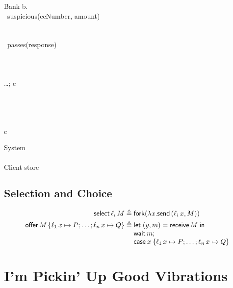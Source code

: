 \documentclass[orivec,envcountsame]{llncs}
\begin{document}
\begin{code}
Bank  \lambda b. \bl
   \\
  \ suspicious(ccNumber, amount)\  \\
  \quad\bl
     \\
     \\
    \ passes(response)\  \\
    \quad \bl
       \\
       \\
       \\
      \dots; c \el \\
     \\
    \quad \bl
       \\
       \\
       \\
      c \el
  \el
\el
\end{code}

\begin{code}
System  \bl
   \\
   \\
  Client \app store
\el
\end{code}

\subsection{Selection and Choice}

\small\begin{align*}
  \gvconst{select} \app \ell_i \app M &\defeq \gvconst{fork} (\lambda x. \gvsend(\ell_i \app x, M)) \\
  \gvconst{offer} \app M \,\{ \ell_1 \app x \mapsto P; \dots; \ell_n \app x \mapsto Q \}
    &\defeq \bl \gvlet{(y,m)}{\gvreceive{M}}{\\\gvletunit{\gvconst{wait} \app m}{\\\gvcase{x}{\ell_1 \app x \mapsto P; \dots; \ell_n \app x \mapsto Q}}} \el
\end{align*}\normalsize

\section{I'm Pickin' Up Good Vibrations}
\end{document}
